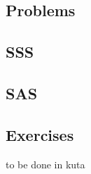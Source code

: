 \subsection{Problems}
\noindent{}
\newpage
\subsection{SSS}
\subsection{SAS}
\newpage
\subsection{Exercises}
to be done in kuta

\newpage
{}
